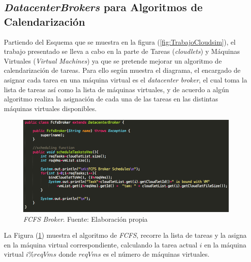 \subsection*{\textit{DatacenterBrokers} para Algoritmos de Calendarización}

Partiendo del Esquema que se muestra en la figura (\ref{fig:TrabajoCloudsim}), el trabajo presentado se lleva a cabo en la parte de Tareas (\textit{cloudlets}) y M\'aquinas Virtuales (\textit{Virtual Machines}) ya que se pretende mejorar un algoritmo de calendarizaci\'on de tareas.
Para ello seg\'un muestra el diagrama, el encargado de asignar cada tarea en una m\'aquina virtual es el \textit{datacenter broker}, el cual toma la lista de tareas as\'i como la lista de m\'aquinas virtuales, y de acuerdo a alg\'un algoritmo realiza la asignaci\'on de cada una de las tareas en las distintas m\'aquinas virtuales disponibles.

\newpage

\setcounter{figure}{11}
\renewcommand\thefigure{\arabic{figure}}
\begin{figure}[h!]
	\centering
	\includegraphics[scale=0.5]{media/FCFS_broker}
	\caption{\textit{FCFS Broker}. Fuente: Elaboración propia}
	\label{fig:fcfsBroker}
\end{figure}

La Figura (\ref{fig:fcfsBroker}) muestra el algoritmo de \textit{FCFS}, recorre la lista de tareas y la asigna en la m\'aquina virtual correspondiente, calculando la tarea actual $i$ en la m\'aquina virtual \textbf{$i\%reqVms$} donde \textbf{$reqVms$} es el n\'umero de m\'aquinas virtuales.


